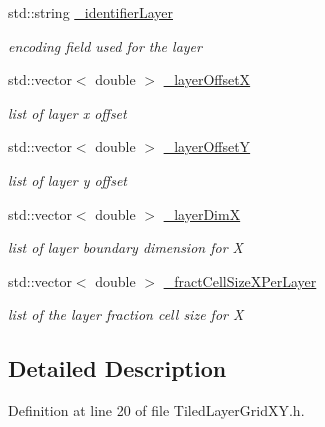 \begin{DoxyCompactItemize}
std::string \hyperlink{class_d_d4hep_1_1_d_d_segmentation_1_1_tiled_layer_grid_x_y_a4dfef8cb6d1319b076579fd565241c84}{\_\-identifierLayer}
\begin{DoxyCompactList}\small\item\em encoding field used for the layer \item\end{DoxyCompactList}\item 
std::vector$<$ double $>$ \hyperlink{class_d_d4hep_1_1_d_d_segmentation_1_1_tiled_layer_grid_x_y_a6974df570df9c6cd533b17a78f3cb0d3}{\_\-layerOffsetX}
\begin{DoxyCompactList}\small\item\em list of layer x offset \item\end{DoxyCompactList}\item 
std::vector$<$ double $>$ \hyperlink{class_d_d4hep_1_1_d_d_segmentation_1_1_tiled_layer_grid_x_y_a0ee4e15bd3807f5ecccc82ffb7962377}{\_\-layerOffsetY}
\begin{DoxyCompactList}\small\item\em list of layer y offset \item\end{DoxyCompactList}\item 
std::vector$<$ double $>$ \hyperlink{class_d_d4hep_1_1_d_d_segmentation_1_1_tiled_layer_grid_x_y_a6ce81c79c43efdb092b454a1047fd666}{\_\-layerDimX}
\begin{DoxyCompactList}\small\item\em list of layer boundary dimension for X \item\end{DoxyCompactList}\item 
std::vector$<$ double $>$ \hyperlink{class_d_d4hep_1_1_d_d_segmentation_1_1_tiled_layer_grid_x_y_a459d90c7d9a34184e093dd0ce01e5157}{\_\-fractCellSizeXPerLayer}
\begin{DoxyCompactList}\small\item\em list of the layer fraction cell size for X \item\end{DoxyCompactList}\end{DoxyCompactItemize}


\subsection{Detailed Description}


Definition at line 20 of file TiledLayerGridXY.h.

